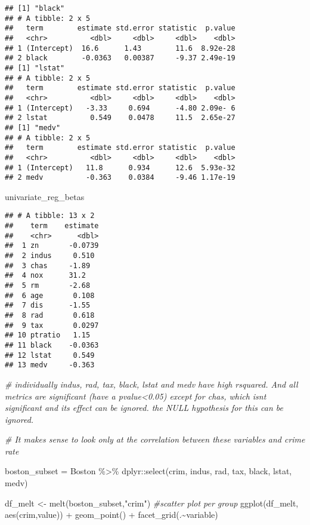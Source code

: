 \documentclass[
]{article}
\newenvironment{Shaded}{\begin{snugshade}}{\end{snugshade}}
\newcommand{\CommentTok}[1]{\textcolor[rgb]{0.56,0.35,0.01}{\textit{#1}}}
\newcommand{\FunctionTok}[1]{\textcolor[rgb]{0.00,0.00,0.00}{#1}}
\newcommand{\NormalTok}[1]{#1}
\newcommand{\OtherTok}[1]{\textcolor[rgb]{0.56,0.35,0.01}{#1}}
\newcommand{\SpecialCharTok}[1]{\textcolor[rgb]{0.00,0.00,0.00}{#1}}
\newcommand{\StringTok}[1]{\textcolor[rgb]{0.31,0.60,0.02}{#1}}
\begin{document}
\begin{verbatim}
## [1] "black"
## # A tibble: 2 x 5
##   term        estimate std.error statistic  p.value
##   <chr>          <dbl>     <dbl>     <dbl>    <dbl>
## 1 (Intercept)  16.6      1.43        11.6  8.92e-28
## 2 black        -0.0363   0.00387     -9.37 2.49e-19
## [1] "lstat"
## # A tibble: 2 x 5
##   term        estimate std.error statistic  p.value
##   <chr>          <dbl>     <dbl>     <dbl>    <dbl>
## 1 (Intercept)   -3.33     0.694      -4.80 2.09e- 6
## 2 lstat          0.549    0.0478     11.5  2.65e-27
## [1] "medv"
## # A tibble: 2 x 5
##   term        estimate std.error statistic  p.value
##   <chr>          <dbl>     <dbl>     <dbl>    <dbl>
## 1 (Intercept)   11.8      0.934      12.6  5.93e-32
## 2 medv          -0.363    0.0384     -9.46 1.17e-19
\end{verbatim}

\begin{Shaded}
\begin{Highlighting}[]
\NormalTok{univariate\_reg\_betas}
\end{Highlighting}
\end{Shaded}

\begin{verbatim}
## # A tibble: 13 x 2
##    term    estimate
##    <chr>      <dbl>
##  1 zn       -0.0739
##  2 indus     0.510 
##  3 chas     -1.89  
##  4 nox      31.2   
##  5 rm       -2.68  
##  6 age       0.108 
##  7 dis      -1.55  
##  8 rad       0.618 
##  9 tax       0.0297
## 10 ptratio   1.15  
## 11 black    -0.0363
## 12 lstat     0.549 
## 13 medv     -0.363
\end{verbatim}

\begin{Shaded}
\begin{Highlighting}[]
\CommentTok{\# individually indus, rad, tax, black, lstat and medv have high rsquared. And all metrics are significant (have a pvalue\textless{}0.05) except for chas, which isnt significant and its effect can be ignored. the NULL hypothesis for this can be ignored. }

\CommentTok{\# It makes sense to look only at the correlation between these variables and crime rate}

\NormalTok{boston\_subset }\OtherTok{=}\NormalTok{ Boston }\SpecialCharTok{\%\textgreater{}\%} 
\NormalTok{  dplyr}\SpecialCharTok{::}\FunctionTok{select}\NormalTok{(crim, indus, rad, tax, black, lstat, medv)}

\NormalTok{df\_melt }\OtherTok{\textless{}{-}} \FunctionTok{melt}\NormalTok{(boston\_subset,}\StringTok{"crim"}\NormalTok{)}
\CommentTok{\#scatter plot per group}
\FunctionTok{ggplot}\NormalTok{(df\_melt, }\FunctionTok{aes}\NormalTok{(crim,value)) }\SpecialCharTok{+}
  \FunctionTok{geom\_point}\NormalTok{() }\SpecialCharTok{+}
  \FunctionTok{facet\_grid}\NormalTok{(.}\SpecialCharTok{\textasciitilde{}}\NormalTok{variable)}
\end{Highlighting}
\end{Shaded}
\end{document}
